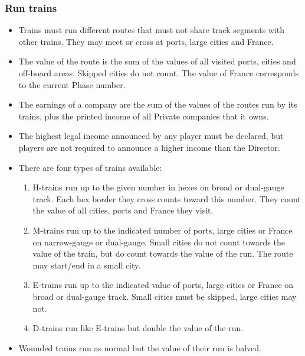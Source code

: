 \documentclass[a4paper,twocolumn]{article}
\begin{document}
\subsubsection{Run trains}
\begin{itemize}
	\item Trains must run different routes that must not share track segments
	with other trains. They may meet or cross at ports, large cities and France.
	\item The value of the route is the sum of the values of all visited ports,
	cities and off-board areas. Skipped cities do not count. The value of France
	corresponds to the current Phase number.
	\item The earnings of a company are the sum of the values of the routes run
	by its trains, plus the printed income of all Private companies that it
	owns.
	\item The highest legal income announced by any player must be declared, but
	players are not required to announce a higher income than the Director.
	\item There are four types of trains available:
	\begin{enumerate}
		\item H-trains run up to the given number in hexes on broad or
		dual-gauge track. Each hex border they cross counts toward this number.
		They count the value of all cities, ports and France they visit.
		\item M-trains run up to the indicated number of ports, large cities or
		France on narrow-gauge or dual-gauge. Small cities do not count towards
		the value of the train, but do count towards the value of the run. The
		route may start/end in a small city.
		\item E-trains run up to the indicated value of ports, large cities or
		France on broad or dual-gauge track. Small cities must be skipped, large
		cities may not.
		\item D-trains run like E-trains but double the value of the run.
	\end{enumerate}
	\item Wounded trains run as normal but the value of their run is halved.
\end{itemize}
\end{document}
